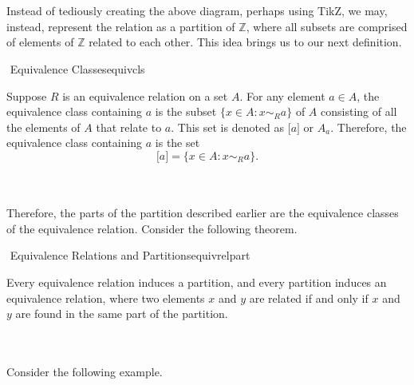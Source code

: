         \vphantom
        \\
        \\
        Instead of tediously creating the above diagram, perhaps using TikZ, we may, instead, represent the relation as a partition of \(\mathbb{Z}\), where all subsets are comprised of elements of \(\mathbb{Z}\) related to each other. This idea brings us to our next definition.
        \begin{definition}{\Stop\,\,Equivalence Classes}{equivcls}
        
            Suppose \(R\) is an equivalence relation on a set \(A\). For any element \(a\in A\), the equivalence class containing \(a\) is the subset \(\{x\in A:x\sim_Ra\}\) of \(A\) consisting of all the elements of \(A\) that relate to \(a\). This set is denoted as \({[}a{]}\) or \(A_a\). Therefore, the equivalence class containing \(a\) is the set
            \begin{equation*}
                {[}a{]}=\{x\in A:x\sim_Ra\}.
            \end{equation*}
        
        \end{definition}
        \vphantom
        \\
        \\
        Therefore, the parts of the partition described earlier are the equivalence classes of the equivalence relation. Consider the following theorem.
        \begin{theorem}{\Stop\,\,Equivalence Relations and Partitions}{equivrelpart}
        
            Every equivalence relation induces a partition, and every partition induces an equivalence relation, where two elements \(x\) and \(y\) are related if and only if \(x\) and \(y\) are found in the same part of the partition.
            
        \end{theorem}
        \pagebreak
        \vphantom
        \\
        \\
        Consider the following example.
